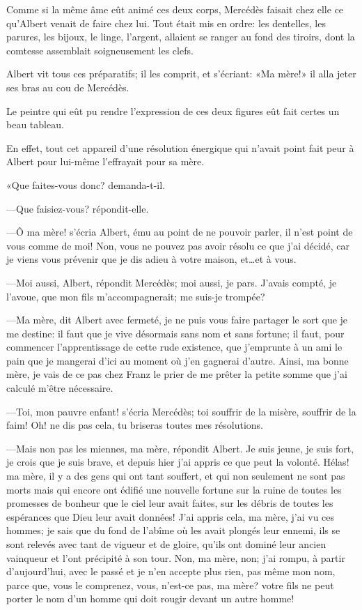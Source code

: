 Comme si la même âme eût animé ces deux corps, Mercédès faisait chez elle ce qu'Albert venait de faire chez lui. Tout était mis en ordre: les dentelles, les parures, les bijoux, le linge, l'argent, allaient se ranger au fond des tiroirs, dont la comtesse assemblait soigneusement les clefs. 

Albert vit tous ces préparatifs; il les comprit, et s'écriant: «Ma mère!» il alla jeter ses bras au cou de Mercédès. 

Le peintre qui eût pu rendre l'expression de ces deux figures eût fait certes un beau tableau. 

En effet, tout cet appareil d'une résolution énergique qui n'avait point fait peur à Albert pour lui-même l'effrayait pour sa mère. 

«Que faites-vous donc? demanda-t-il. 

—Que faisiez-vous? répondit-elle. 

—Ô ma mère! s'écria Albert, ému au point de ne pouvoir parler, il n'est point de vous comme de moi! Non, vous ne pouvez pas avoir résolu ce que j'ai décidé, car je viens vous prévenir que je dis adieu à votre maison, et\dots et à vous. 

—Moi aussi, Albert, répondit Mercédès; moi aussi, je pars. J'avais compté, je l'avoue, que mon fils m'accompagnerait; me suis-je trompée? 

—Ma mère, dit Albert avec fermeté, je ne puis vous faire partager le sort que je me destine: il faut que je vive désormais sans nom et sans fortune; il faut, pour commencer l'apprentissage de cette rude existence, que j'emprunte à un ami le pain que je mangerai d'ici au moment où j'en gagnerai d'autre. Ainsi, ma bonne mère, je vais de ce pas chez Franz le prier de me prêter la petite somme que j'ai calculé m'être nécessaire. 

—Toi, mon pauvre enfant! s'écria Mercédès; toi souffrir de la misère, souffrir de la faim! Oh! ne dis pas cela, tu briseras toutes mes résolutions. 

—Mais non pas les miennes, ma mère, répondit Albert. Je suis jeune, je suis fort, je crois que je suis brave, et depuis hier j'ai appris ce que peut la volonté. Hélas! ma mère, il y a des gens qui ont tant souffert, et qui non seulement ne sont pas morts mais qui encore ont édifié une nouvelle fortune sur la ruine de toutes les promesses de bonheur que le ciel leur avait faites, sur les débris de toutes les espérances que Dieu leur avait données! J'ai appris cela, ma mère, j'ai vu ces hommes; je sais que du fond de l'abîme où les avait plongés leur ennemi, ils se sont relevés avec tant de vigueur et de gloire, qu'ils ont dominé leur ancien vainqueur et l'ont précipité à son tour. Non, ma mère, non; j'ai rompu, à partir d'aujourd'hui, avec le passé et je n'en accepte plus rien, pas même mon nom, parce que, vous le comprenez, vous, n'est-ce pas, ma mère? votre fils ne peut porter le nom d'un homme qui doit rougir devant un autre homme! 

